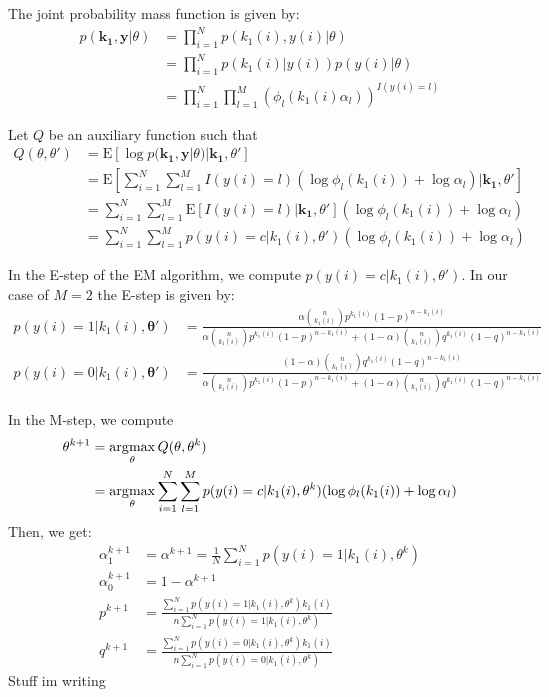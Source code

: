 The joint probability mass function is given by:
\begin{align*}
p(\mathbf{k_1}, \mathbf{y} | \theta ) &= \prod_{i=1}^{N} p(k_1(i), y(i) | \theta ) \\
&= \prod_{i=1}^{N} p(k_1(i) | y(i) ) p(y(i) | \theta )  \\
&= \prod_{i=1}^{N} \prod_{l=1}^{M} (\phi_l(k_1(i) \alpha_l)) ^ {I(y(i)=l)}
\end{align*}

Let $Q$ be an auxiliary function such that
\begin{align*}
Q(\theta, \theta') &= \mathrm{E} \left[ \log p(\mathbf{k_1}, \mathbf{y} | \theta ) | \mathbf{k_1}, \theta' \right] \\
&= \mathrm{E} \left[ \sum_{i=1}^{N} \sum_{l=1}^{M} I(y(i)=l) (\log \phi_l(k_1(i)) + \log \alpha_l) | \mathbf{k_1}, \theta' \right] \\
&= \sum_{i=1}^{N} \sum_{l=1}^{M} \mathrm{E} \left[ I(y(i)=l) | \mathbf{k_1}, \theta' \right] (\log \phi_l(k_1(i)) + \log \alpha_l)  \\
&= \sum_{i=1}^{N} \sum_{l=1}^{M} p(y(i) = c | k_1(i), \theta') (\log \phi_l(k_1(i)) + \log \alpha_l)
\end{align*}

In the E-step of the EM algorithm, we compute $p(y(i) = c | k_1(i), \theta')$. 
In our case of $M=2$ the E-step is given by:
\begin{align*}
p(y(i) = 1 | k_1(i), \mathbf{\theta'}) &= \frac{\alpha \binom{n}{k_1(i)} p^{k_1(i)} (1-p)^{n-k_1(i)}}{\alpha \binom{n}{k_1(i)} p^{k_1(i)} (1-p)^{n-k_1(i)} + (1-\alpha) \binom{n}{k_1(i)} q^{k_1(i)} (1-q)^{n-k_1(i)}} \\
p(y(i) = 0 | k_1(i), \mathbf{\theta'}) &= \frac{(1-\alpha) \binom{n}{k_1(i)} q^{k_1(i)} (1-q)^{n-k_1(i)}}{\alpha \binom{n}{k_1(i)} p^{k_1(i)} (1-p)^{n-k_1(i)} + (1-\alpha) \binom{n}{k_1(i)} q^{k_1(i)} (1-q)^{n-k_1(i)}}
\end{align*}

In the M-step, we compute
\begin{align*}
\theta^{k+1} &= \operatorname*{\arg\!\max}_\theta Q(\theta, \theta^{k}) \\
&= \operatorname*{\arg\!\max}_\theta \sum_{i=1}^{N} \sum_{l=1}^{M} p(y(i) = c | k_1(i), \theta^{k}) (\log \phi_l(k_1(i)) + \log \alpha_l)
\end{align*}
Then, we get:
\begin{align*}
\alpha_1^{k+1} &= \alpha^{k+1} = \frac{1}{N} \sum_{i=1}^{N} p(y(i) = 1 | k_1(i), \theta^{k}) \\
\alpha_0^{k+1} &= 1 - \alpha^{k+1} \\
p^{k+1} &= \frac{\sum_{i=1}^{N} p(y(i) = 1 | k_1(i), \theta^{k}) k_1(i)}{n \sum_{i=1}^{N} p(y(i) = 1 | k_1(i), \theta^{k})} \\
q^{k+1} &= \frac{\sum_{i=1}^{N} p(y(i) = 0 | k_1(i), \theta^{k}) k_1(i)}{n \sum_{i=1}^{N} p(y(i) = 0 | k_1(i), \theta^{k})}
\end{align*}
Stuff im writing


